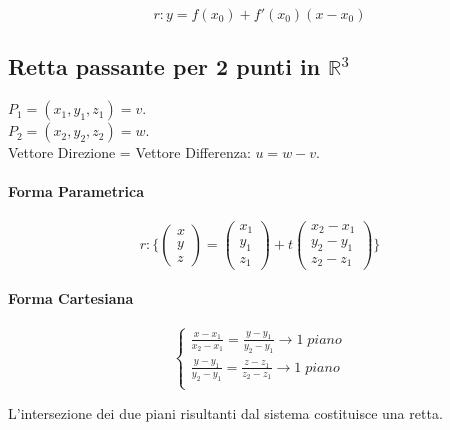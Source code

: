 \documentclass{article}
\begin{document}
\begin{equation*}
    r: y = f(x_0) + f'(x_0)(x - x_0)
\end{equation*}

\subsection{Retta passante per 2 punti in $\mathbb{R}^3$}

$P_1 = (x_1, y_1, z_1) = v$. \\
$P_2 = (x_2, y_2, z_2) = w$. \\
Vettore Direzione = Vettore Differenza: $u = w - v$.

\paragraph{Forma Parametrica}

\begin{equation*}
    r: \{
    \begin{pmatrix}
        x \\
        y \\
        z
    \end{pmatrix} =
    \begin{pmatrix}
        x_1 \\
        y_1 \\
        z_1
    \end{pmatrix} + t
    \begin{pmatrix}
        x_2 - x_1 \\
        y_2 - y_1 \\
        z_2 - z_1
    \end{pmatrix}
    \}
\end{equation*}

\paragraph{Forma Cartesiana}

\begin{equation*}
    \begin{cases}
        \frac{x - x_1}{x_2 - x_1} = \frac{y - y_1}{y_2 - y_1} \rightarrow 1 \; piano \\
        \frac{y - y_1}{y_2 - y_1} = \frac{z - z_1}{z_2 - z_1} \rightarrow 1 \; piano \\
    \end{cases}
\end{equation*}

L'intersezione dei due piani risultanti dal sistema costituisce una retta.
\end{document}
